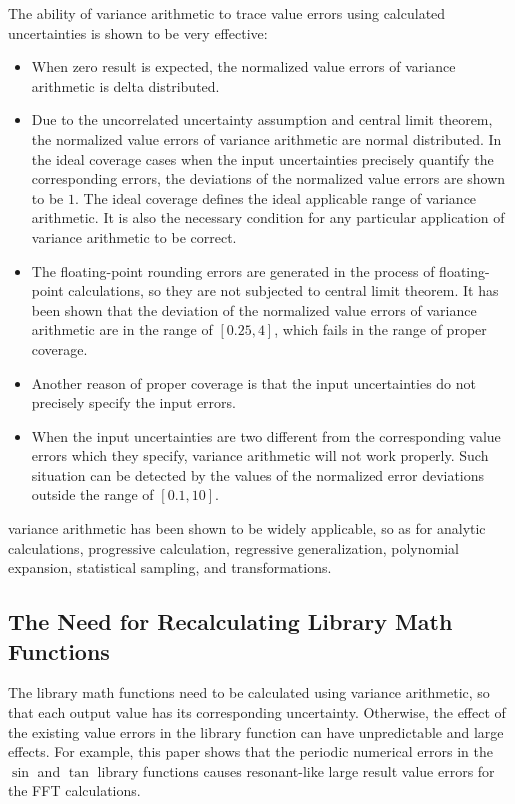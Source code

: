 \documentclass[twoside]{article}
\numberwithin{equation}{section}
\begin{document}
The ability of variance arithmetic to trace value errors using calculated uncertainties is shown to be very effective:
\begin{itemize}
\item When zero result is expected, the normalized value errors of variance arithmetic is delta distributed.

\item Due to the uncorrelated uncertainty assumption and central limit theorem, the normalized value errors of variance arithmetic are normal distributed.
In the ideal coverage cases when the input uncertainties precisely quantify the corresponding errors, the deviations of the normalized value errors are shown to be $1$.
The ideal coverage defines the ideal applicable range of variance arithmetic.
It is also the necessary condition for any particular application of variance arithmetic to be correct.

\item The floating-point rounding errors are generated in the process of floating-point calculations, so they are not subjected to central limit theorem.
It has been shown that the deviation of the normalized value errors of variance arithmetic are in the range of $[0.25, 4]$, which fails in the range of proper coverage.

\item Another reason of proper coverage is that the input uncertainties do not precisely specify the input errors.

\item When the input uncertainties are two different from the corresponding value errors which they specify, variance arithmetic will not work properly.
Such situation can be detected by the values of the normalized error deviations outside the range of $[0.1, 10]$.
\end{itemize}

variance arithmetic has been shown to be widely applicable, so as for analytic calculations, progressive calculation, regressive generalization, polynomial expansion, statistical sampling, and transformations.


\subsection{The Need for Recalculating Library Math Functions}

The library math functions need to be calculated using variance arithmetic, so that each output value has its corresponding uncertainty.
Otherwise, the effect of the existing value errors in the library function can have unpredictable and large effects.
For example, this paper shows that the periodic numerical errors in the $\sin$ and $\tan$ library functions causes resonant-like large result value errors for the FFT calculations.
\end{document}
